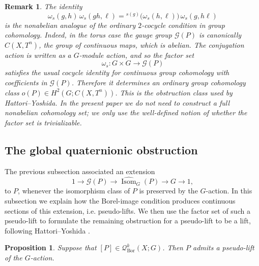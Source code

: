 \documentclass[11pt,a4paper]{article}
\numberwithin{equation}{section}
\newtheorem{remark}[definition]{Remark}
\newtheorem{prop}[definition]{Proposition}
\theoremstyle{named}
\begin{document}
\begin{remark}
The identity
\[
\omega_s(g,h)\,\omega_s(gh,\ell)
=
{}^{s(g)}\!\bigl(\omega_s(h,\ell)\bigr)\,
\omega_s(g,h\ell)
\]
is the nonabelian analogue of the ordinary \(2\)-cocycle condition in group cohomology. Indeed, in the torus case the gauge group $\mathcal{G}(P)$ is canonically $C(X,T^n)$, the group of continuous maps, 
which is abelian. The conjugation action is written as a \(G\)-module action, and so the factor set
\[
\omega_s:G\times G\longrightarrow \mathcal G(P)
\]
satisfies the usual cocycle identity for continuous group cohomology with coefficients in \(\mathcal G(P)\). Therefore it determines an ordinary group cohomology class $o(P)\in H^2(G;C(X,T^n))$.
This is the obstruction class used by Hattori--Yoshida.
 In the present paper we do not need to construct a full nonabelian cohomology set; we only use the well-defined notion of whether the factor set is trivializable.
\end{remark}

\subsection{The global quaternionic obstruction}

The previous subsection associated an extension
\[
1\longrightarrow \mathcal G(P)
\longrightarrow
\widehat{\operatorname{Isom}}_G(P)
\longrightarrow
G
\longrightarrow 1,
\]
to \(P\), whenever the isomorphism class of \(P\) is preserved by the \(G\)-action. In this subsection we explain how the Borel-image condition produces continuous sections of this extension, i.e. pseudo-lifts. We then use the factor set of such a pseudo-lift to formulate the remaining obstruction for a pseudo-lift to be a lift, following Hattori--Yoshida \cite[Lemma~2.3]{hatyos}.

\begin{prop}
\label{prop:pseudolift-from-borel}
Suppose that $[P]\in \mathcal{Q}^k_\mathrm{Bor}(X;G)$. Then \(P\) admits a pseudo-lift of the \(G\)-action.
\end{prop}
\end{document}
